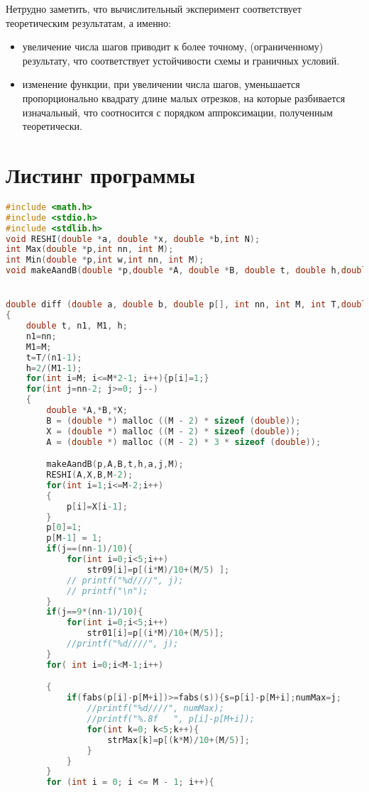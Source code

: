 \documentclass{article}
\theoremstyle{remark}
\theoremstyle{definition}
\begin{document}
Нетрудно заметить, что вычислительный эксперимент соответствует теоретическим результатам, а именно:
\begin{itemize}
\item[1)] увеличение числа шагов приводит к более точному, (ограниченному) результату, что соответствует устойчивости схемы и граничных условий.
\item[2)] изменение функции, при увеличении числа шагов, уменьшается пропорционально квадрату длине малых отрезков, на которые разбивается изначальный, что соотносится с порядком аппроксимации, полученным теоретически.
\end{itemize}
	\section{Листинг программы}
	\begin{lstlisting}[language=C]
#include <math.h>
#include <stdio.h>
#include <stdlib.h>
void RESHI(double *a, double *x, double *b,int N);
int Max(double *p,int nn, int M);
int Min(double *p,int w,int nn, int M);
void makeAandB(double *p,double *A, double *B, double t, double h,double a,int j,int M);


double diff (double a, double b, double p[], int nn, int M, int T,double strMax[],int numMax,double str01[],double str09[],double s)
{
    double t, n1, M1, h;
    n1=nn;
    M1=M;
    t=T/(n1-1);
    h=2/(M1-1);
    for(int i=M; i<=M*2-1; i++){p[i]=1;}
    for(int j=nn-2; j>=0; j--)
    {
        double *A,*B,*X;
        B = (double *) malloc ((M - 2) * sizeof (double));
        X = (double *) malloc ((M - 2) * sizeof (double));
        A = (double *) malloc ((M - 2) * 3 * sizeof (double));

        makeAandB(p,A,B,t,h,a,j,M);
        RESHI(A,X,B,M-2);
        for(int i=1;i<=M-2;i++)
        {
            p[i]=X[i-1];
        }
        p[0]=1;
        p[M-1] = 1;
        if(j==(nn-1)/10){
            for(int i=0;i<5;i++)
                str09[i]=p[(i*M)/10+(M/5) ];
            // printf("%d////", j);
            // printf("\n");
        }
        if(j==9*(nn-1)/10){
            for(int i=0;i<5;i++)
                str01[i]=p[(i*M)/10+(M/5)];
            //printf("%d////", j);
        }
        for( int i=0;i<M-1;i++)

        {
            if(fabs(p[i]-p[M+i])>=fabs(s)){s=p[i]-p[M+i];numMax=j;
                //printf("%d////", numMax);
                //printf("%.8f   ", p[i]-p[M+i]);
                for(int k=0; k<5;k++){
                    strMax[k]=p[(k*M)/10+(M/5)];
                }
            }
        }
        for (int i = 0; i <= M - 1; i++){


\end{lstlisting}
\end{document}
